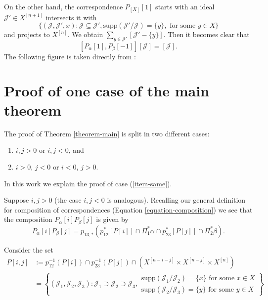 On the other hand, the correspondence
$P_{[X]}[1]$
starts with an ideal $\mathcal{J}'\in
X^{[n+1]}$
intersects it with
$$
\{(\mathcal{J}, \mathcal{J}',x)
:\mathcal{J}\subseteq
\mathcal{J}',\text{supp}(\mathcal{J}'/\mathcal{J})=\{y\},
\text{ for some }y\in X\}
$$
and projects to $X^{[n]}$. We obtain
$\sum_{y \in
\mathcal{J}'}[\mathcal{J}'-\{y\}]$.
Then it becomes clear that
$$
[P_\alpha[1],P_\beta[-1]][\mathcal{J}]=[\mathcal{J}].
$$
The following figure is taken directly from
\cite{Nakajima-lectures}:



\section{Proof of one case of the main
theorem}
\label{section-proof}

\noindent
The proof of Theorem \ref{theorem-main} is
split
in two different cases:
\begin{enumerate}
\item $i,j>0$ or $i,j<0$, and
\label{item-same}
\item $i>0$, $j<0$ or $i<0$, $j>0$.
\label{item-different}
\end{enumerate}

\noindent
In this work we explain the proof of case
(\ref{item-same}).

\medskip\noindent
Suppose $i,j>0$ (the case $i,j<0$ is
analogous).
Recalling our general definition for
composition of correspondences
(Equation \ref{equation-composition})
we see that
the composition $P_\alpha[i]P_\beta[j]$ is
given by
\begin{equation}
\label{equation-composition-pij}
P_\alpha[i]P_\beta[j]
=p_{13,*}(p_{12}^*[P[i]]\cap\Pi_1^*\alpha\cap p_{23}^*[P[j]]\cap\Pi_2^*\beta).
\end{equation}

Consider the set
\begin{equation}
\label{equation-cycle-pij}
\begin{aligned}
P[i,j]&:=p_{12}^{-1}(P[i])\cap
p_{23}^{-1}(P[j])
\cap(X^{[n-i-j]}\times X^{[n-j]}\times
X^{[n]})\\
&=\left\{(\mathcal{J}_1,\mathcal{J}_2,\mathcal{J}_3):
\mathcal{J}_1\supset\mathcal{J}_2\supset\mathcal{J}_3,
\substack{
\text{supp}(\mathcal{J}_1/\mathcal{J}_2)=\{x\}
\text{ for some }x\in X\\
\text{supp}(\mathcal{J}_2/\mathcal{J}_3)=\{y\}
\text{ for some }y \in X }\right\}
\end{aligned}
\end{equation}


